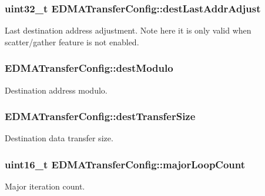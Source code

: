\subsubsection[{\texorpdfstring{dest\+Last\+Addr\+Adjust}{destLastAddrAdjust}}]{\setlength{\rightskip}{0pt plus 5cm}uint32\+\_\+t E\+D\+M\+A\+Transfer\+Config\+::dest\+Last\+Addr\+Adjust}\hypertarget{structEDMATransferConfig_afe235925c12cfd39b89e5b73308c87c1}{}\label{structEDMATransferConfig_afe235925c12cfd39b89e5b73308c87c1}
Last destination address adjustment. Note here it is only valid when scatter/gather feature is not enabled. 
\subsubsection[{\texorpdfstring{dest\+Modulo}{destModulo}}]{ E\+D\+M\+A\+Transfer\+Config\+::dest\+Modulo}\hypertarget{structEDMATransferConfig_a0941f5eab0cb5e32c47959a38cbdeef8}{}\label{structEDMATransferConfig_a0941f5eab0cb5e32c47959a38cbdeef8}
Destination address modulo. 
\subsubsection[{\texorpdfstring{dest\+Transfer\+Size}{destTransferSize}}]{ E\+D\+M\+A\+Transfer\+Config\+::dest\+Transfer\+Size}\hypertarget{structEDMATransferConfig_a69a61bee8a0b47271644a9f9162d9170}{}\label{structEDMATransferConfig_a69a61bee8a0b47271644a9f9162d9170}
Destination data transfer size. 
\subsubsection[{\texorpdfstring{major\+Loop\+Count}{majorLoopCount}}]{\setlength{\rightskip}{0pt plus 5cm}uint16\+\_\+t E\+D\+M\+A\+Transfer\+Config\+::major\+Loop\+Count}\hypertarget{structEDMATransferConfig_aab33d5809b66064e4808662db93d260b}{}\label{structEDMATransferConfig_aab33d5809b66064e4808662db93d260b}
Major iteration count. 
